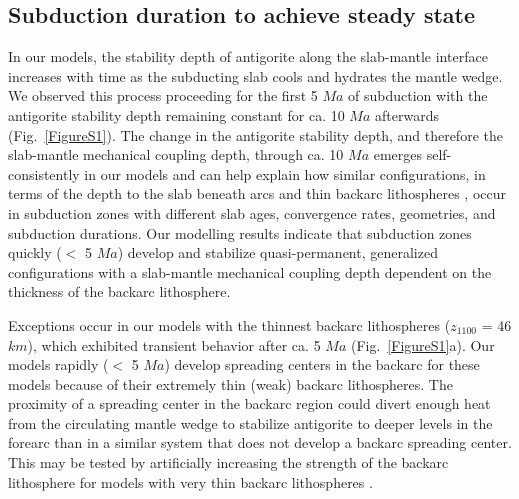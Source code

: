 \documentclass[draft]{agujournal2019}
\begin{document}
\subsection*{Subduction duration to achieve steady state}
In our models, the stability depth of antigorite along the slab-mantle interface increases with time as the subducting slab cools and hydrates the mantle wedge. We observed this process proceeding for the first 5 $Ma$ of subduction with the antigorite stability depth remaining constant for ca. 10 $Ma$ afterwards (Fig.~\ref{FigureS1}). The change in the antigorite stability depth, and therefore the slab-mantle mechanical coupling depth, through ca. 10 $Ma$ emerges self-consistently in our models and can help explain how similar configurations, in terms of the depth to the slab beneath arcs \cite{England2004} and thin backarc lithospheres \cite{Currie2006}, occur in subduction zones with different slab ages, convergence rates, geometries, and subduction durations. Our modelling results indicate that subduction zones quickly ($<$ 5 $Ma$) develop and stabilize quasi-permanent, generalized configurations with a slab-mantle mechanical coupling depth dependent on the thickness of the backarc lithosphere.

Exceptions occur in our models with the thinnest backarc lithospheres ($z_{1100}$ = 46 $km$), which exhibited transient behavior after ca. 5 $Ma$ (Fig.~\ref{FigureS1}a). Our models rapidly ($<$ 5 $Ma$) develop spreading centers in the backarc for these models because of their extremely thin (weak) backarc lithospheres. The proximity of a spreading center in the backarc region could divert enough heat from the circulating mantle wedge to stabilize antigorite to deeper levels in the forearc than in a similar system that does not develop a backarc spreading center.  This may be tested by artificially increasing the strength of the backarc lithosphere for models with very thin backarc lithospheres .
\end{document}
